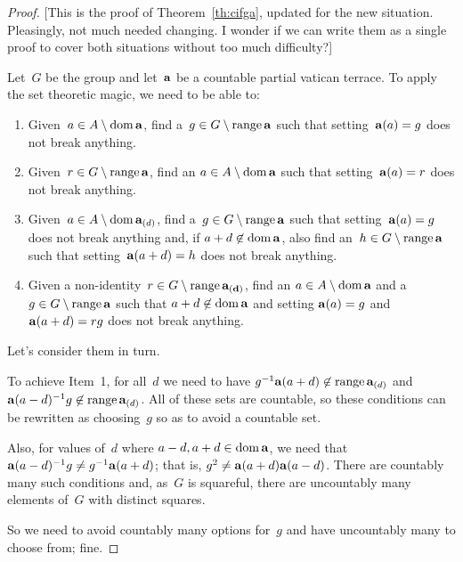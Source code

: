 \documentclass[a4paper,12pt]{article}
\newcommand{\dom}{\mathop{\rm dom}\nolimits}
\newcommand{\range}{\mathop{\rm range}\nolimits}
\begin{document}
\begin{proof}  

[This is the proof of Theorem~\ref{th:cifga}, updated for the new situation.  Pleasingly, not much needed changing.  I wonder if we can write them as a single proof to cover both situations without too much difficulty?]

Let~$G$ be the group and let~${\bf a}$ be a countable partial vatican terrace.  To apply the set theoretic magic, we need to be able to:

\begin{enumerate}
\item Given~$a \in A \setminus \dom{{\bf a}}$, find a~$g \in G \setminus \range{{\bf a}}$ such that setting~${\bf a}(a) = g$ does not break anything.
  
\item Given~$r \in G \setminus \range{{\bf a}}$, find an $a \in A \setminus \dom{{\bf a}}$ such that setting~${\bf a}(a) = r$ does not break anything.

\item Given~$a \in A \setminus \dom{{\bf a}_{(d)}}$, find a~$g \in G \setminus \range{{\bf a}}$ such that setting~${\bf a}(a) = g$ does not break anything and, if $a + d \not\in \dom{{\bf a}}$, also find an~$h \in G \setminus \range{{\bf a}}$ such that setting~${\bf a}(a+d) = h$ does not break anything.

\item Given a non-identity~$r \in G \setminus \range{{\bf a_{(d)}}}$,  find an $a \in A \setminus \dom{{\bf a}}$ and a~$g \in G \setminus \range{{\bf a}}$ such that $a+ d \not\in \dom{{\bf a}}$ and setting ${\bf a}(a) = g$ and ${\bf a}(a+d) = rg$ does not break anything.
\end{enumerate}

Let's consider them in turn.

To achieve Item~1, for all~$d$ we need to have $g^{-1} {\bf a}(a+d) \not\in \range{ {\bf a}_{(d)} }$ and ${\bf a}(a-d)^{-1} g \not\in \range{ {\bf a}_{(d)} }$. All of these sets are countable, so these conditions can be rewritten as choosing~$g$ so as to avoid a countable set.  

Also, for values of~$d$ where $a-d, a+d \in \dom{{\bf a}}$, we need that ${\bf a}(a-d)^{-1} g \neq g^{-1} {\bf a}(a+d)$; that is, $g^2  \neq {\bf a}(a+d){\bf a}(a-d)$.  There are countably many such conditions and, as~$G$ is squareful, there are uncountably many elements of~$G$ with distinct squares.  

So we need to avoid countably many options for~$g$ and have uncountably many to choose from; fine.


\end{proof}
\end{document}
